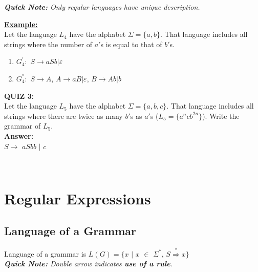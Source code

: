 \documentclass[12pt,a4paper]{article}
\begin{document}
\textit{\textbf{Quick Note: }Only regular languages have unique description.}\\

\clearpage

\noindent \underline{\textbf{Example:}}\\
Let the language $L_{4}$ have the alphabet $\Sigma= \lbrace a,b \rbrace$. That language includes all strings where the number of $a'$s is equal to that of $b'$s.

\begin{enumerate}
\item $G_{4}^{'}:$ $S \rightarrow aSb|\varepsilon$
\item $G_{4}^{''}:$ $S \rightarrow A$, $A \rightarrow aB|\varepsilon$, $B\rightarrow Ab|b$
\end{enumerate}

\noindent \textbf{\Large{QUIZ 3:}}\\
Let the language $L_{5}$ have the alphabet $\Sigma= \lbrace a,b,c \rbrace$. That language includes all strings where there are twice as many $b'$s as $a'$s ($L_{5}=\lbrace a^{n}cb^{2n}\rbrace$). Write the grammar of $L_{5}$.\\


\noindent \textbf{\Large{Answer:}}\\
$S\rightarrow$ $aSbb$ $|$ $c$\\

\\

\clearpage

\section{Regular Expressions}
\subsection{Language of a Grammar}
Language of a grammar is $L(G)=\lbrace x$ $|$ $x$ $\in$ $\Sigma^{*}$, $S\overset{*}{\Rightarrow}x\rbrace$\\

\textit{\textbf{Quick Note:} Double arrow indicates \textbf{use of a rule}.}\\
\end{document}
